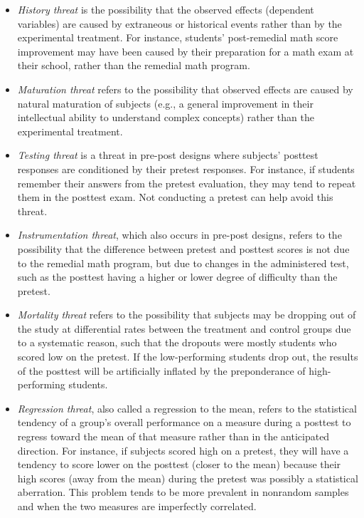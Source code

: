 \begin{itemize}
	\item \textit{History threat} is the possibility that the observed effects (dependent variables) are caused by extraneous or historical events rather than by the experimental treatment. For instance, students’ post-remedial math score improvement may have been caused by their preparation for a math exam at their school, rather than the remedial math program.
	\item \textit{Maturation threat} refers to the possibility that observed effects are caused by natural maturation of subjects (e.g., a general improvement in their intellectual ability to understand complex concepts) rather than the experimental treatment.
	\item \textit{Testing threat} is a threat in pre-post designs where subjects’ posttest responses are conditioned by their pretest responses. For instance, if students remember their answers from the pretest evaluation, they may tend to repeat them in the posttest exam. Not conducting a pretest can help avoid this threat.
	\item \textit{Instrumentation threat}, which also occurs in pre-post designs, refers to the possibility that the difference between pretest and posttest scores is not due to the remedial math program, but due to changes in the administered test, such as the posttest having a higher or lower degree of difficulty than the pretest.
	\item \textit{Mortality threat} refers to the possibility that subjects may be dropping out of the study at differential rates between the treatment and control groups due to a systematic reason, such that the dropouts were mostly students who scored low on the pretest. If the low-performing students drop out, the results of the posttest will be artificially inflated by the preponderance of high-performing students.
	\item \textit{Regression threat}, also called a regression to the mean, refers to the statistical tendency of a group’s overall performance on a measure during a posttest to regress toward the mean of that measure rather than in the anticipated direction. For instance, if subjects scored high on a pretest, they will have a tendency to score lower on the posttest (closer to the mean) because their high scores (away from the mean) during the pretest was possibly a statistical aberration. This problem tends to be more prevalent in nonrandom samples and when the two measures are imperfectly correlated.
\end{itemize}


